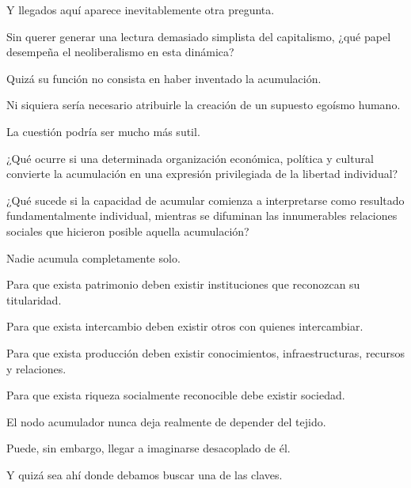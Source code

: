 \documentclass[12pt,a4paper]{article}
\begin{document}
Y llegados aquí aparece inevitablemente otra pregunta.

Sin querer generar una lectura demasiado simplista del capitalismo, ¿qué papel desempeña el neoliberalismo en esta dinámica?

Quizá su función no consista en haber inventado la acumulación.

Ni siquiera sería necesario atribuirle la creación de un supuesto egoísmo humano.

La cuestión podría ser mucho más sutil.

¿Qué ocurre si una determinada organización económica, política y cultural convierte la acumulación en una expresión privilegiada de la libertad individual?

¿Qué sucede si la capacidad de acumular comienza a interpretarse como resultado fundamentalmente individual, mientras se difuminan las innumerables relaciones sociales que hicieron posible aquella acumulación?

Nadie acumula completamente solo.

Para que exista patrimonio deben existir instituciones que reconozcan su titularidad.

Para que exista intercambio deben existir otros con quienes intercambiar.

Para que exista producción deben existir conocimientos, infraestructuras, recursos y relaciones.

Para que exista riqueza socialmente reconocible debe existir sociedad.

El nodo acumulador nunca deja realmente de depender del tejido.

Puede, sin embargo, llegar a imaginarse desacoplado de él.

Y quizá sea ahí donde debamos buscar una de las claves.
\end{document}
